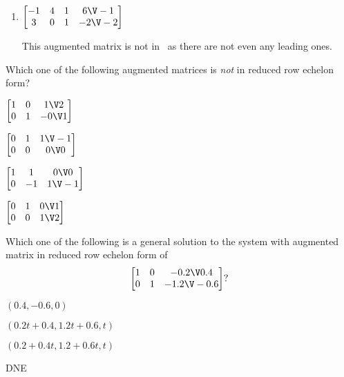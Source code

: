 \begin{example}
\begin{enumerate}
\item \(\begin{bmatrix} -1&4&1&6\V-1
\\3&0&1&-2\V-2
 \end{bmatrix}\)
\begin{solution} 
This augmented matrix is not in \rref\ as there are not even any leading ones. 
\end{solution}
\end{enumerate}
\end{example}



\begin{activity}
Which one of the following augmented matrices is \emph{not} in reduced row echelon form?
\begin{parts}
\item \(\begin{bmatrix} 1&0&1\V2
\\0&1&-0\V1 \end{bmatrix}\)
\item \(\begin{bmatrix} 0&1&1\V-1
\\0&0&0\V0 \end{bmatrix}\)
\item \(\begin{bmatrix} 1&1&0\V0
\\0&-1&1\V-1 \end{bmatrix}\)%
\item \(\begin{bmatrix} 0&1&0\V1
\\0&0&1\V2 \end{bmatrix}\)
\end{parts}
\end{activity}





\begin{activity}
Which one of the following is a general solution to the system with augmented matrix in reduced row echelon form of
\begin{equation*}
\begin{bmatrix} 1&0&-0.2\V0.4
\\0&1&-1.2\V-0.6 \end{bmatrix}?
\end{equation*}
\begin{parts}
\item \((0.4,-0.6,0)\)
\item \((0.2t+0.4,1.2t+0.6,t)\)%
\item \((0.2+0.4t,1.2+0.6t,t)\)
\item DNE
\end{parts}
\end{activity}



